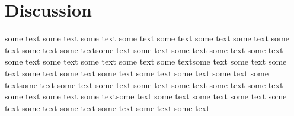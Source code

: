 \section{Discussion}
\label{sec:discussion}

some text some text some text some text some text some text some text
some text some text some textsome text some text some text some text
some text some text some text some text some text some textsome text
some text some text some text some text some text some text some text
some text some textsome text some text some text some text some text
some text some text some text some text some textsome text some text
some text some text some text some text some text some text some text
some text

